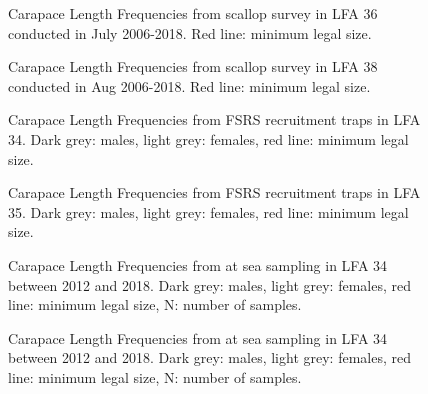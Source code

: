 \documentclass[11pt]{article}
\newcommand{\e}{\string~/bio.data/bio.lobster/figures/LFA3438Framework2019/figures/} %
\begin{document}
    \begin{figure}
    \centering
        \caption{Carapace Length Frequencies from scallop survey in LFA 36 conducted in July 2006-2018. Red line: minimum legal size.}

    \end{figure}



    \begin{figure}
    \centering
        \caption{Carapace Length Frequencies from scallop survey in LFA 38 conducted in Aug 2006-2018. Red line: minimum legal size.}

    \end{figure}




    \begin{figure}
    \centering
        \caption{Carapace Length Frequencies from FSRS recruitment traps in LFA 34. Dark grey: males, light grey: females, red line: minimum legal size.}

    \end{figure}


    \begin{figure}
    \centering
        \caption{Carapace Length Frequencies from FSRS recruitment traps in LFA 35. Dark grey: males, light grey: females, red line: minimum legal size.}

    \end{figure}



   \begin{figure}
    \centering
        \caption{Carapace Length Frequencies from at sea sampling in LFA 34 between 2012 and 2018. Dark grey: males, light grey: females, red line: minimum legal size, N: number of samples.}

    \end{figure}

   \begin{figure}
    \centering
        \caption{Carapace Length Frequencies from at sea sampling in LFA 34 between 2012 and 2018. Dark grey: males, light grey: females, red line: minimum legal size, N: number of samples.}

    \end{figure}
\end{document}
